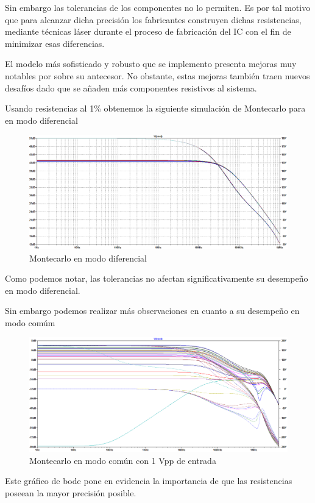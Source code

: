 Sin embargo las tolerancias de los componentes no lo permiten. Es por tal motivo que para alcanzar dicha precisión los fabricantes construyen dichas resistencias, mediante técnicas láser durante el proceso de fabricación del IC con el fin de minimizar esas diferencias.

El modelo más sofisticado y robusto que se implemento presenta mejoras muy notables por sobre su antecesor. No obstante, estas mejoras también traen nuevos desafíos dado que se añaden más componentes resistivos al sistema.

Usando resistencias al 1\% obtenemos la siguiente simulación de Montecarlo para en modo diferencial

\begin{figure}[H]
	\centering
	\includegraphics[width=\textwidth]{./ImagenesDeSimulaciones/MonteCarloModoDiferencialGrande.png}
	\caption{Montecarlo en modo diferencial}
\end{figure}  
Como podemos notar, las tolerancias no afectan significativamente su desempeño en modo diferencial.

Sin embargo podemos realizar más observaciones en cuanto a su desempeño en modo comúm
\begin{figure}[H]
	\centering
	\includegraphics[height=0.3\textheight]{./ImagenesDeSimulaciones/MonteCarloModoComunGrande1V.png}
	\caption{Montecarlo en modo común con 1 Vpp de entrada}
\end{figure} 
Este gráfico de bode pone en evidencia la importancia de que las resistencias poseean la mayor precisión posible.

